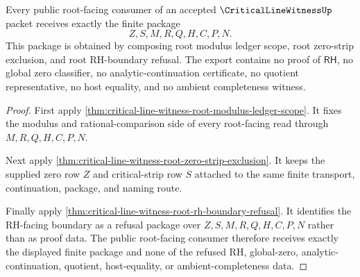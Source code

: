 \begin{theorem}
\label{thm:critical-line-witness-root-public-export}
Every public root-facing consumer of an accepted $\CriticalLineWitnessUp$ packet receives exactly the finite package
$$
Z,S,M,R,Q,H,C,P,N .
$$
This package is obtained by composing root modulus ledger scope, root zero-strip exclusion, and root RH-boundary refusal. The export contains no proof of $\mathsf{RH}$, no global zero classifier, no analytic-continuation certificate, no quotient representative, no host equality, and no ambient completeness witness.
\end{theorem}
\begin{proof}
First apply \autoref{thm:critical-line-witness-root-modulus-ledger-scope}. It fixes the modulus and rational-comparison side of every root-facing read through $M,R,Q,H,C,P,N$.

Next apply \autoref{thm:critical-line-witness-root-zero-strip-exclusion}. It keeps the supplied zero row $Z$ and critical-strip row $S$ attached to the same finite transport, continuation, package, and naming route.

Finally apply \autoref{thm:critical-line-witness-root-rh-boundary-refusal}. It identifies the RH-facing boundary as a refusal package over $Z,S,M,R,Q,H,C,P,N$ rather than as proof data. The public root-facing consumer therefore receives exactly the displayed finite package and none of the refused RH, global-zero, analytic-continuation, quotient, host-equality, or ambient-completeness data.
\end{proof}
